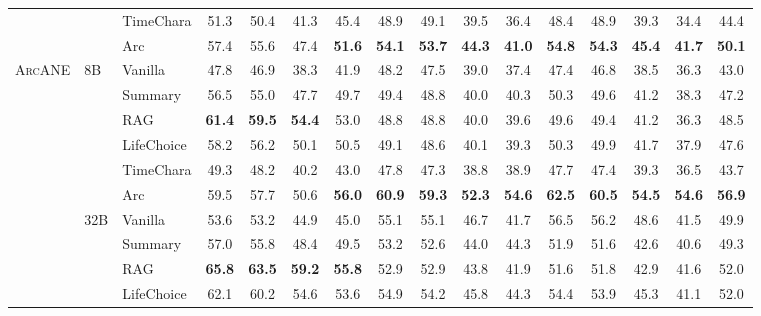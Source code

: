 \documentclass[11pt]{article}
\newcommand{\ours}{\textsc{ArcANE}}
\begin{document}
\begin{table}[!htbp]
\begin{tabular}{lllccccccccccccc}
 &  & TimeChara & 51.3 & 50.4 & 41.3 & 45.4 & 48.9 & 49.1 & 39.5 & 36.4 & 48.4 & 48.9 & 39.3 & 34.4 & 44.4 \\
 &  & \cellcolor{yellow!15} Arc & \cellcolor{yellow!15} 57.4 & \cellcolor{yellow!15} 55.6 & \cellcolor{yellow!15} 47.4 & \cellcolor{yellow!15} \textbf{51.6} & \cellcolor{yellow!15} \textbf{54.1} & \cellcolor{yellow!15} \textbf{53.7} & \cellcolor{yellow!15} \textbf{44.3} & \cellcolor{yellow!15} \textbf{41.0} & \cellcolor{yellow!15} \textbf{54.8} & \cellcolor{yellow!15} \textbf{54.3} & \cellcolor{yellow!15} \textbf{45.4} & \cellcolor{yellow!15} \textbf{41.7} & \cellcolor{yellow!15} \textbf{50.1} \\
\midrule
\multirow[t]{12}{*}{\ours} & \multirow[t]{6}{*}{8B} & Vanilla & 47.8 & 46.9 & 38.3 & 41.9 & 48.2 & 47.5 & 39.0 & 37.4 & 47.4 & 46.8 & 38.5 & 36.3 & 43.0 \\
 &  & Summary & 56.5 & 55.0 & 47.7 & 49.7 & 49.4 & 48.8 & 40.0 & 40.3 & 50.3 & 49.6 & 41.2 & 38.3 & 47.2 \\
 &  & RAG & \textbf{61.4} & \textbf{59.5} & \textbf{54.4} & 53.0 & 48.8 & 48.8 & 40.0 & 39.6 & 49.6 & 49.4 & 41.2 & 36.3 & 48.5 \\
 &  & LifeChoice & 58.2 & 56.2 & 50.1 & 50.5 & 49.1 & 48.6 & 40.1 & 39.3 & 50.3 & 49.9 & 41.7 & 37.9 & 47.6 \\
 &  & TimeChara & 49.3 & 48.2 & 40.2 & 43.0 & 47.8 & 47.3 & 38.8 & 38.9 & 47.7 & 47.4 & 39.3 & 36.5 & 43.7 \\
 &  & \cellcolor{yellow!15} Arc & \cellcolor{yellow!15} 59.5 & \cellcolor{yellow!15} 57.7 & \cellcolor{yellow!15} 50.6 & \cellcolor{yellow!15} \textbf{56.0} & \cellcolor{yellow!15} \textbf{60.9} & \cellcolor{yellow!15} \textbf{59.3} & \cellcolor{yellow!15} \textbf{52.3} & \cellcolor{yellow!15} \textbf{54.6} & \cellcolor{yellow!15} \textbf{62.5} & \cellcolor{yellow!15} \textbf{60.5} & \cellcolor{yellow!15} \textbf{54.5} & \cellcolor{yellow!15} \textbf{54.6} & \cellcolor{yellow!15} \textbf{56.9} \\
\cmidrule(l){2-16}
 & \multirow[t]{6}{*}{32B} & Vanilla & 53.6 & 53.2 & 44.9 & 45.0 & 55.1 & 55.1 & 46.7 & 41.7 & 56.5 & 56.2 & 48.6 & 41.5 & 49.9 \\
 &  & Summary & 57.0 & 55.8 & 48.4 & 49.5 & 53.2 & 52.6 & 44.0 & 44.3 & 51.9 & 51.6 & 42.6 & 40.6 & 49.3 \\
 &  & RAG & \textbf{65.8} & \textbf{63.5} & \textbf{59.2} & \textbf{55.8} & 52.9 & 52.9 & 43.8 & 41.9 & 51.6 & 51.8 & 42.9 & 41.6 & 52.0 \\
 &  & LifeChoice & 62.1 & 60.2 & 54.6 & 53.6 & 54.9 & 54.2 & 45.8 & 44.3 & 54.4 & 53.9 & 45.3 & 41.1 & 52.0 \\

\end{tabular}
\end{table}
\end{document}
